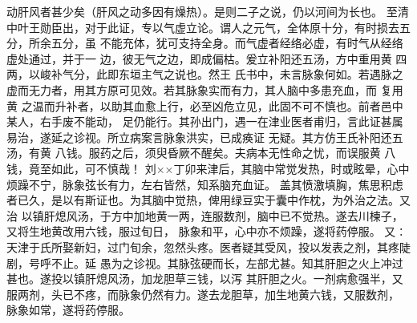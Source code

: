 \documentclass[a4paper,12pt,UTF8,twoside]{ctexbook}
\begin{document}
动肝风者甚少矣（肝风之动多因有燥热）。是则二子之说，仍以河间为长也。 
至清中叶王勋臣出，对于此证，专以气虚立论。谓人之元气，全体原十分，有时损去五分，所余五分，虽 
不能充体，犹可支持全身。而气虚者经络必虚，有时气从经络虚处通过，并于一 
边，彼无气之边，即成偏枯。爰立补阳还五汤，方中重用黄 四两，以峻补气分，此即东垣主气之说也。然王 
氏书中，未言脉象何如。若遇脉之虚而无力者，用其方原可见效。若其脉象实而有力，其人脑中多患充血，而 
复用黄 之温而升补者，以助其血愈上行，必至凶危立见，此固不可不慎也。前者邑中某人，右手废不能动， 
足仍能行。其孙出门，遇一在津业医者甫归，言此证甚属易治，遂延之诊视。所立病案言脉象洪实，已成痪证 
无疑。其方仿王氏补阳还五汤，有黄 八钱。服药之后，须臾昏厥不醒矣。夫病本无性命之忧，而误服黄 八 
钱，竟至如此，可不慎哉！ 
刘××丁卯来津后，其脑中常觉发热，时或眩晕，心中烦躁不宁，脉象弦长有力，左右皆然，知系脑充血证。 
盖其愤激填胸，焦思积虑者已久，是以有斯证也。为其脑中觉热，俾用绿豆实于囊中作枕，为外治之法。又治 
以镇肝熄风汤，于方中加地黄一两，连服数剂，脑中已不觉热。遂去川楝子，又将生地黄改用六钱，服过旬日， 
脉象和平，心中亦不烦躁，遂将药停服。 
又∶天津于氏所娶新妇，过门旬余，忽然头疼。医者疑其受风，投以发表之剂，其疼陡剧，号呼不止。延 
愚为之诊视。其脉弦硬而长，左部尤甚。知其肝胆之火上冲过甚也。遂投以镇肝熄风汤，加龙胆草三钱，以泻 
其肝胆之火。一剂病愈强半，又服两剂，头已不疼，而脉象仍然有力。遂去龙胆草，加生地黄六钱，又服数剂， 
脉象如常，遂将药停服。 
\end{document}
